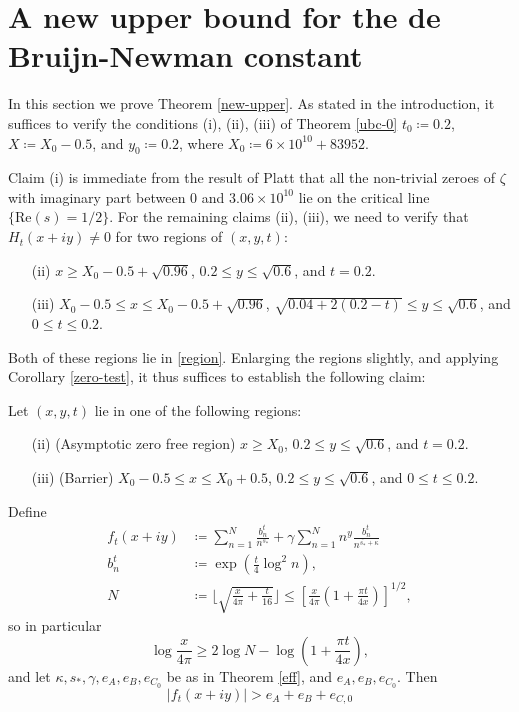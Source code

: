 \section{A new upper bound for the de Bruijn-Newman constant}

In this section we prove Theorem \ref{new-upper}.  As stated in the introduction, it suffices to verify the conditions (i), (ii), (iii) of Theorem \ref{ubc-0} $t_0 \coloneqq 0.2$, $X \coloneqq X_0-0.5$, and $y_0 \coloneqq 0.2$, where $X_0 \coloneqq 6 \times 10^{10} + 83952$.  

Claim (i) is immediate from the result of Platt \cite{platt} that all the non-trivial zeroes of $\zeta$ with imaginary part between $0$ and $3.06 \times 10^{10}$ lie on the critical line $\{ \mathrm{Re}(s) = 1/2\}$.  For the remaining claims (ii), (iii), we need to verify that $H_t(x+iy) \neq 0$ for two regions of $(x,y,t)$:
\begin{itemize}
\item[(ii)]  $x \geq X_0 - 0.5 + \sqrt{0.96}$, $0.2 \leq y \leq \sqrt{0.6}$, and $t = 0.2$. 
\item[(iii)]  $X_0 - 0.5 \leq x \leq X_0 - 0.5 + \sqrt{0.96}$, $\sqrt{0.04 + 2(0.2-t)} \leq y \leq \sqrt{0.6}$, and $0 \leq t \leq 0.2$.
\end{itemize}
Both of these regions lie in \eqref{region}.  Enlarging the regions slightly, and applying Corollary \ref{zero-test}, it thus suffices to establish the following claim:

\begin{proposition}\label{sweep}  Let $(x,y,t)$ lie in one of the following regions:
\begin{itemize}
\item[(ii)] (Asymptotic zero free region) $x \geq X_0$, $0.2 \leq y \leq \sqrt{0.6}$, and $t = 0.2$.
\item[(iii)] (Barrier)  $X_0 - 0.5 \leq x \leq X_0 + 0.5$, $0.2 \leq y \leq \sqrt{0.6}$, and $0 \leq t \leq 0.2$.
\end{itemize}
Define
\begin{align*}
f_t(x+iy) &\coloneqq \sum_{n=1}^N \frac{b_n^t}{n^{s_*}} + \gamma \sum_{n=1}^N n^y \frac{b_n^t}{n^{\overline{s_*} + \kappa}}\\
b_n^t &\coloneqq \exp( \frac{t}{4} \log^2 n),\\
N &\coloneqq \lfloor \sqrt{\frac{x}{4\pi} + \frac{t}{16}} \rfloor \leq [\frac{x}{4\pi} (1 + \frac{\pi t}{4x})]^{1/2},
\end{align*}
so in particular
\begin{equation}\label{logx}
 \log \frac{x}{4\pi} \geq 2 \log N - \log(1 + \frac{\pi t}{4x}),
\end{equation}
and let $\kappa, s_*, \gamma, e_A, e_B, e_{C_0}$ be as in Theorem \ref{eff}, and $e_A, e_B, e_{C_0}$.  Then
\begin{equation}\label{bbb}
|f_t(x+iy)| > e_A + e_B + e_{C,0} 
\end{equation}
\end{proposition}

